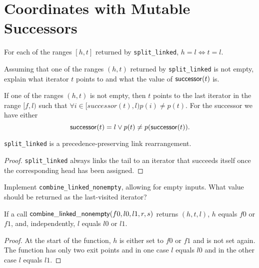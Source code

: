 \chapter{Coordinates with Mutable Successors}

\begin{lemma}
	For each of the ranges $[h, t]$ returned by \verb|split_linked|, $h = l \Leftrightarrow t = l$.
\end{lemma}

\begin{exercise}
	Assuming that one of the ranges $(h, t)$ returned by \verb|split_linked| is not empty, explain what
	iterator $t$ points to and what the value of $\mathsf{successor}(t)$ is.
\end{exercise}

\begin{solution}
	If one of the ranges $(h, t)$ is not empty, then $t$ points to the last iterator in the range $[f, l)$ such
	that $\forall i \in [successor(t), l) p(i) \neq p(t)$. For the successor we have either
	\[ \mathsf{successor}(t) = l \vee p(t) \neq p(\mathsf{successor}(t)). \]
\end{solution}

\begin{lemma}
	\verb|split_linked| is a precedence-preserving link rearrangement.
\end{lemma}

\begin{proof}
	\verb|split_linked| always links the tail to an iterator that succeeds itself once the corresponding
	head has been assigned.
\end{proof}

\begin{exercise}
	Implement \verb|combine_linked_nonempty|, allowing for empty inputs. What value should be returned as the
	last-visited iterator?
\end{exercise}



\begin{lemma}
	If a call $\mathsf{combine\_linked\_nonempty}(f0, l0, l1, r, s)$ returns $(h, t, l)$, $h$ equals $f0$ or $f1$,
	and, independently, $l$ equals $l0$ or $l1$.
\end{lemma}

\begin{proof}
	At the start of the function, $h$ is either set to $f0$ or $f1$ and is not set again. The function
	has only two exit points and in one case $l$ equals $l0$ and in the other case $l$ equals $l1$.
\end{proof}

